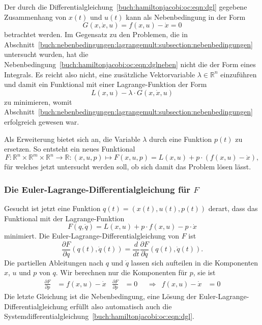 Der durch die Differentialgleichung~\eqref{buch:hamiltonjacobi:oc:eqn:dgl}
gegebene Zusammenhang von $x(t)$ und $u(t)$ kann als Nebenbedingung 
in der Form
\begin{equation}
G(x,\dot{x}, u)
=
f(x,u) - \dot{x} = 0
\label{buch:hamiltonjacobi:oc:eqn:dglneben}
\end{equation}
betrachtet werden.
Im Gegensatz zu den Problemen, die in
Abschnitt~\ref{buch:nebenbedingungen:lagrangemult:subsection:nebenbedingungen}
untersucht wurden, hat die
Nebenbedingung~\eqref{buch:hamiltonjacobi:oc:eqn:dglneben}
nicht die der Form eines Integrals.
Es reicht also nicht, eine zusätzliche Vektorvariable $\lambda\in\mathbb{R}^n$
einzuführen und damit ein Funktional mit einer Lagrange-Funktion der Form
\[
L(x,u) - \lambda \cdot G(x,\dot{x},u)
\]
zu minimieren, womit
Abschnitt~\ref{buch:nebenbedingungen:lagrangemult:subsection:nebenbedingungen}
erfolgreich gewesen war.

Als Erweiterung bietet sich an, die Variable $\lambda$ durch eine
Funktion $p(t)$ zu ersetzen.
So entsteht ein neues Funktional
\[
F
\colon
\mathbb{R}^n\times\mathbb{R}^m\times\mathbb{R}^n
\to\mathbb{R}
:
(x,u,p)
\mapsto
F(x,u,p)
=
L(x,u) + p\cdot (f(x,u) - \dot{x}),
\]
für welches jetzt untersucht werden soll, ob sich damit das Problem lösen
lässt.

%
%
\subsubsection{Die Euler-Lagrange-Differentialgleichung für $F$}
Gesucht ist jetzt eine Funktion $q(t)=(x(t),u(t),p(t))$ derart,
dass das Funktional mit der Lagrange-Funktion
\[
F(q,\dot{q})
=
L(x,u) +p\cdot f(x,u) - p\cdot \dot{x}
\]
minimiert.
Die Euler-Lagrange-Differentialgleichung von $F$ ist
\begin{equation}
\frac{\partial F}{\partial q}(q(t),\dot{q}(t))
=
\frac{d}{dt}
\frac{\partial F}{\partial \dot{q}}(q(t),\dot{q}(t)).
\label{buch:hamiltonjacobi:oc:eqn:Feulerlagrange}
\end{equation}
Die partiellen Ableitungen nach $q$ und $\dot{q}$ lassen sich aufteilen
in die Komponenten $x$, $u$ und $p$ von $q$.
Wir berechnen nur die Komponenten für $p$, sie ist
\begin{align}
\frac{\partial F}{\partial p}
&=
f(x,u)
-
\dot{x}
&
\frac{\partial F}{\partial \dot{p}}
&=
0
&&\Rightarrow&
f(x,u)-\dot{x}&=0
\label{buch:hamiltonjacobi:oc:eqn:Fsystemdgl}
\end{align}
Die letzte Gleichung ist die Nebenbedingung, eine Lösung der
Euler-Lagrange-Differential\-gleichung erfüllt also automatisch auch die
Systemdifferentialgleichung~\eqref{buch:hamiltonjacobi:oc:eqn:dgl}.

